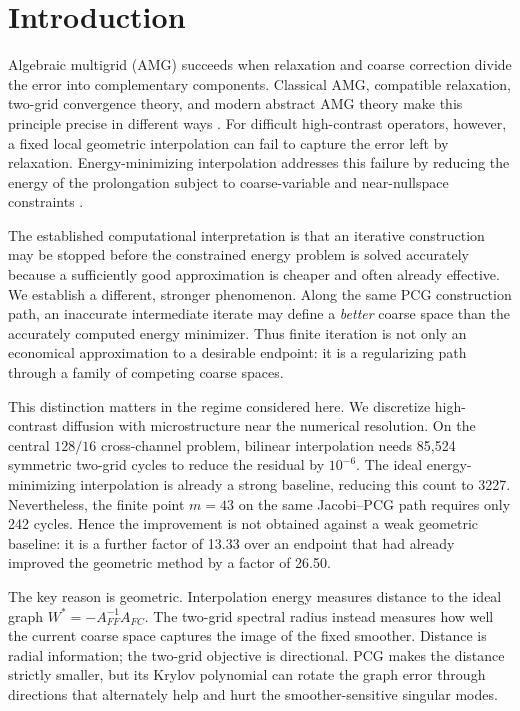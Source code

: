 \documentclass[smallextended]{svjour3}
\begin{document}
\section{Introduction}\label{sec:introduction}
Algebraic multigrid (AMG) succeeds when relaxation and coarse correction divide the error into complementary components. Classical AMG, compatible relaxation, two-grid convergence theory, and modern abstract AMG theory make this principle precise in different ways \cite{ruge1987amg,trottenberg2001multigrid,falgout2005twogrid,brannick2010compatible,xu2017amg}. For difficult high-contrast operators, however, a fixed local geometric interpolation can fail to capture the error left by relaxation. Energy-minimizing interpolation addresses this failure by reducing the energy of the prolongation subject to coarse-variable and near-nullspace constraints \cite{mandel1999energy,wan2000energy,kolev2006energy,brannick2007energy,olson2011energy,brannick2019role,janna2023parallel}.

The established computational interpretation is that an iterative construction may be stopped before the constrained energy problem is solved accurately because a sufficiently good approximation is cheaper and often already effective. We establish a different, stronger phenomenon. Along the same PCG construction path, an inaccurate intermediate iterate may define a \emph{better} coarse space than the accurately computed energy minimizer. Thus finite iteration is not only an economical approximation to a desirable endpoint: it is a regularizing path through a family of competing coarse spaces.

This distinction matters in the regime considered here. We discretize high-contrast diffusion with microstructure near the numerical resolution. On the central $128/16$ cross-channel problem, bilinear interpolation needs 85,524 symmetric two-grid cycles to reduce the residual by $10^{-6}$. The ideal energy-minimizing interpolation is already a strong baseline, reducing this count to 3227. Nevertheless, the finite point $m=43$ on the same Jacobi--PCG path requires only 242 cycles. Hence the improvement is not obtained against a weak geometric baseline: it is a further factor of 13.33 over an endpoint that had already improved the geometric method by a factor of 26.50.

The key reason is geometric. Interpolation energy measures distance to the ideal graph $W^*=-A_{FF}^{-1}A_{FC}$. The two-grid spectral radius instead measures how well the current coarse space captures the image of the fixed smoother. Distance is radial information; the two-grid objective is directional. PCG makes the distance strictly smaller, but its Krylov polynomial can rotate the graph error through directions that alternately help and hurt the smoother-sensitive singular modes.
\end{document}
